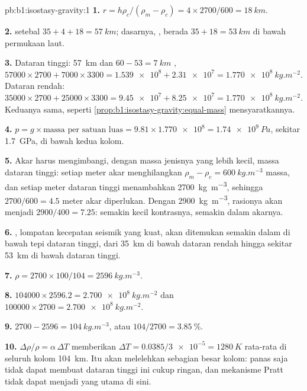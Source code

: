 \begin{solution}{pb:b1:isostasy-gravity:1}
\textbf{1.} $r = h\rho_c/(\rho_m - \rho_c) = 4\times2700/600 = \qty{18}{km}$.

\textbf{2.}  setebal $35 + 4 + 18 = \qty{57}{km}$; dasarnya, ,
berada $35 + 18 = \qty{53}{km}$ di bawah permukaan laut.

\textbf{3.} Dataran tinggi: \qty{57}{km}  dan $60 - 53 = \qty{7}{km}$ ,
$\num{57000}\times2700 + \num{7000}\times3300 = \num{1.539e8} + \num{2.31e7} =
\qty{1.770e8}{kg.m^{-2}}$. Dataran rendah: $\num{35000}\times2700 + \num{25000}\times3300
= \num{9.45e7} + \num{8.25e7} = \qty{1.770e8}{kg.m^{-2}}$. Keduanya sama, seperti
\cref{prop:b1:isostasy-gravity:equal-mass} mensyaratkannya.

\textbf{4.} $p = g\times\text{massa per satuan luas} = 9.81\times\num{1.770e8} =
\qty{1.74e9}{Pa}$, sekitar \qty{1.7}{GPa}, di bawah kedua kolom.

\textbf{5.} Akar harus mengimbangi, dengan massa jenisnya yang lebih kecil, massa dataran tinggi:
setiap meter akar menghilangkan $\rho_m - \rho_c = \qty{600}{kg.m^{-3}}$ massa,
dan setiap meter dataran tinggi menambahkan \qty{2700}{kg.m^{-3}}, sehingga $2700/600 = 4.5$
meter akar diperlukan. Dengan  \qty{2900}{kg.m^{-3}}, rasionya
akan menjadi $2900/400 = 7.25$: semakin kecil kontrasnya, semakin dalam akarnya.

\textbf{6.} , lompatan kecepatan seismik yang kuat, akan ditemukan
semakin dalam di bawah tepi dataran tinggi, dari \qty{35}{km} di bawah dataran rendah
hingga sekitar \qty{53}{km} di bawah dataran tinggi.

\textbf{7.} $\rho = 2700\times100/104 = \qty{2596}{kg.m^{-3}}$.

\textbf{8.} $\num{104000}\times2596.2 = \qty{2.700e8}{kg.m^{-2}}$ dan
$\num{100000}\times2700 = \qty{2.700e8}{kg.m^{-2}}$.

\textbf{9.} $2700 - 2596 = \qty{104}{kg.m^{-3}}$, atau $104/2700 =
\qty{3.85}{\percent}$.

\textbf{10.} $\Delta\rho/\rho = \alpha\,\Delta T$ memberikan $\Delta T =
0.0385/\num{3e-5} = \qty{1280}{K}$ rata-rata di seluruh kolom \qty{104}{km}. Itu akan melelehkan sebagian besar kolom: panas saja tidak dapat membuat dataran tinggi ini
cukup ringan, dan mekanisme Pratt tidak dapat menjadi yang utama di sini.


\end{solution}
